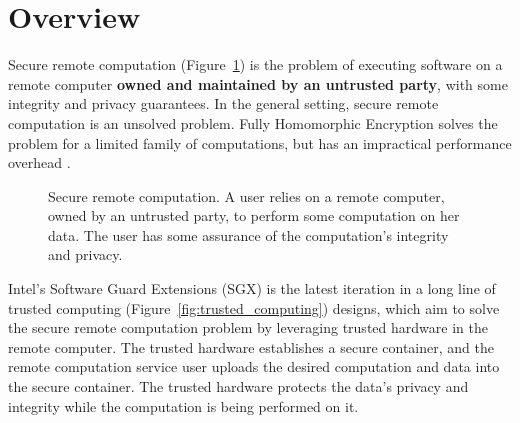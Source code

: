 \section{Overview}
\label{sec:intro}

Secure remote computation (Figure~\ref{fig:remote_computation}) is the problem
of executing software on a remote computer \textbf{owned and maintained by an
untrusted party}, with some integrity and privacy guarantees. In the general
setting, secure remote computation is an unsolved problem. Fully Homomorphic
Encryption \cite{gentry2009fhe} solves the problem for a limited family of
computations, but has an impractical performance overhead
\cite{naehrig2011can}.

\begin{figure}[hbt]
  \caption{
    Secure remote computation. A user relies on a remote computer, owned by an
    untrusted party, to perform some computation on her data. The user has some
    assurance of the computation's integrity and privacy.
  }
  \label{fig:remote_computation}
\end{figure}

Intel's Software Guard Extensions (SGX) is the latest iteration in a long line
of trusted computing (Figure~\ref{fig:trusted_computing}) designs, which aim to
solve the secure remote computation problem by leveraging trusted hardware in
the remote computer. The trusted hardware establishes a secure container, and
the remote computation service user uploads the desired computation and data
into the secure container. The trusted hardware protects the data's privacy
and integrity while the computation is being performed on it.

